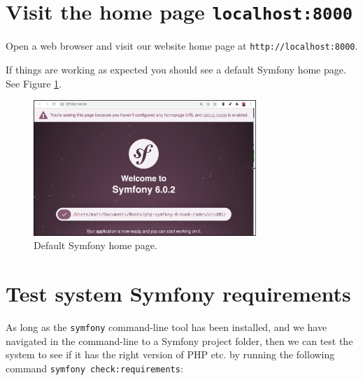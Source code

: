 \documentclass[a4paperpaper,openright]{book}
\begin{document}
\hypertarget{visit-the-home-page-localhost8000}{%
\section{\texorpdfstring{Visit the home page
\texttt{localhost:8000}}{Visit the home page localhost:8000}}\label{visit-the-home-page-localhost8000}}

Open a web browser and visit our website home page at
\texttt{http://localhost:8000}.

If things are working as expected you should see a default Symfony home
page. See Figure \ref{homepage}.

\begin{figure}
\centering
\includegraphics[width=0.75\textwidth,height=\textheight]{./tex2pdf.-564b08cce17d66dc/7a430dcb3125bbcf87bbbecc80178ddec044edda.png}
\caption{Default Symfony home page. \label{homepage}}
\end{figure}

\hypertarget{test-system-symfony-requirements}{%
\section{Test system Symfony
requirements}\label{test-system-symfony-requirements}}

As long as the \texttt{symfony} command-line tool has been installed,
and we have navigated in the command-line to a Symfony project folder,
then we can test the system to see if it has the right version of PHP
etc. by running the following command
\texttt{symfony\ check:requirements}:
\end{document}
